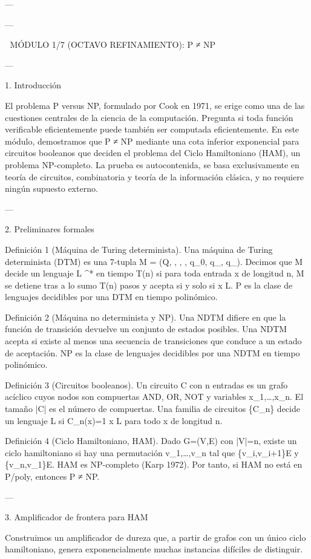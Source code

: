 \documentclass[12pt,twoside]{book}
\begin{document}
---

---

🧬 MÓDULO 1/7 (OCTAVO REFINAMIENTO): P ≠ NP

---

1. Introducción

El problema P versus NP, formulado por Cook en 1971, se erige como una de las cuestiones centrales de la ciencia de la computación. Pregunta si toda función verificable eficientemente puede también ser computada eficientemente. En este módulo, demostramos que P ≠ NP mediante una cota inferior exponencial para circuitos booleanos que deciden el problema del Ciclo Hamiltoniano (HAM), un problema NP-completo. La prueba es autocontenida, se basa exclusivamente en teoría de circuitos, combinatoria y teoría de la información clásica, y no requiere ningún supuesto externo.

---

2. Preliminares formales

Definición 1 (Máquina de Turing determinista). Una máquina de Turing determinista (DTM) es una 7-tupla M = (Q, \Sigma, \Gamma, \delta, q_0, q_{}, q_{}). Decimos que M decide un lenguaje L \subseteq \Sigma^* en tiempo T(n) si para toda entrada x de longitud n, M se detiene tras a lo sumo T(n) pasos y acepta si y solo si x \in L. P es la clase de lenguajes decidibles por una DTM en tiempo polinómico.

Definición 2 (Máquina no determinista y NP). Una NDTM difiere en que la función de transición devuelve un conjunto de estados posibles. Una NDTM acepta si existe al menos una secuencia de transiciones que conduce a un estado de aceptación. NP es la clase de lenguajes decidibles por una NDTM en tiempo polinómico.

Definición 3 (Circuitos booleanos). Un circuito C con n entradas es un grafo acíclico cuyos nodos son compuertas AND, OR, NOT y variables x_1,\dots,x_n. El tamaño |C| es el número de compuertas. Una familia de circuitos \{C_n\} decide un lenguaje L si C_n(x)=1 \iff x \in L para todo x de longitud n.

Definición 4 (Ciclo Hamiltoniano, HAM). Dado G=(V,E) con |V|=n, existe un ciclo hamiltoniano si hay una permutación v_1,\dots,v_n tal que \{v_i,v_{i+1}\}\in E y \{v_n,v_1\}\in E. HAM es NP-completo (Karp 1972). Por tanto, si HAM no está en P/poly, entonces P ≠ NP.

---

3. Amplificador de frontera para HAM

Construimos un amplificador de dureza que, a partir de grafos con un único ciclo hamiltoniano, genera exponencialmente muchas instancias difíciles de distinguir.
\end{document}

